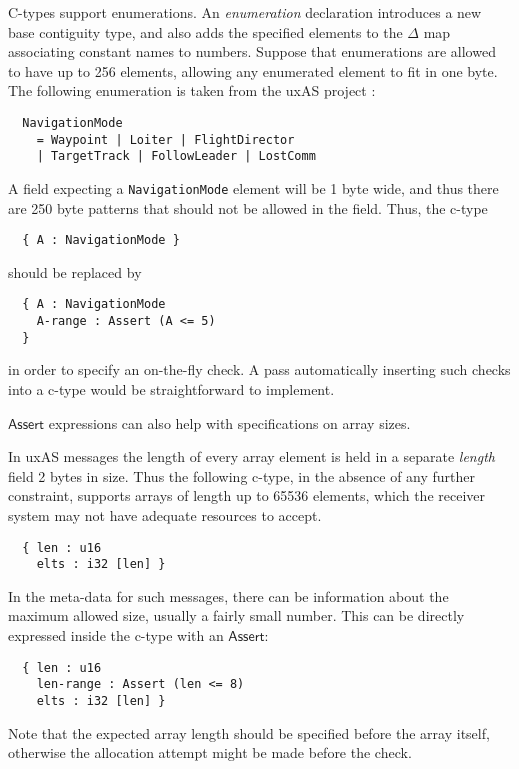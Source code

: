 \documentclass[svgnames]{llncs}
\newcommand{\konst}[1]{\ensuremath{\mathsf{#1}}}
\begin{document}
\begin{example}
C-types support enumerations. An \emph{enumeration} declaration
introduces a new base contiguity type, and also adds the specified
elements to the $\Delta$ map associating constant names to numbers.
Suppose that enumerations are allowed to have up to 256 elements,
allowing any enumerated element to fit in one byte. The following
enumeration is taken from the uxAS project \cite{}:
\begin{verbatim}
  NavigationMode
    = Waypoint | Loiter | FlightDirector
    | TargetTrack | FollowLeader | LostComm
\end{verbatim}

A field expecting a \verb+NavigationMode+ element will be 1 byte wide,
and thus there are 250 byte patterns that should not be allowed in the
field. Thus, the c-type

\begin{verbatim}
  { A : NavigationMode }
\end{verbatim}

should be replaced by

\begin{verbatim}
  { A : NavigationMode
    A-range : Assert (A <= 5)
  }
\end{verbatim}

\noindent in order to specify an on-the-fly check. A pass automatically
inserting such checks into a c-type would be straightforward to
implement.

\end{example}

\noindent \konst{Assert} expressions can also help with specifications
on array sizes.

\begin{example}

In uxAS messages the length of every array element is held in a
separate \emph{length} field 2 bytes in size. Thus the following
c-type, in the absence of any further constraint, supports arrays of
length up to 65536 elements, which the receiver system may not have
adequate resources to accept.

\begin{verbatim}
  { len : u16
    elts : i32 [len] }
\end{verbatim}

\noindent In the meta-data for such messages, there can be information
about the maximum allowed size, usually a fairly small number. This
can be directly expressed inside the c-type with an \konst{Assert}:

\begin{verbatim}
  { len : u16
    len-range : Assert (len <= 8)
    elts : i32 [len] }
\end{verbatim}

\noindent Note that the expected array length should be specified
before the array itself, otherwise the allocation attempt might be
made before the check.
\end{example}
\end{document}
